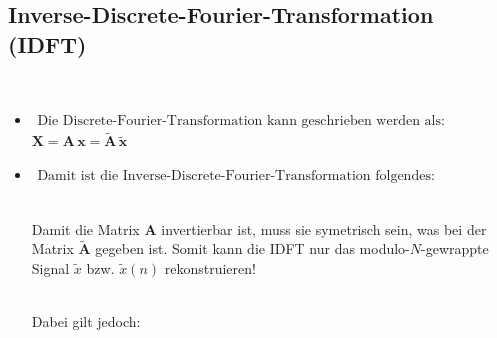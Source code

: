 	\subsection{Inverse-Discrete-Fourier-Transformation (IDFT)}
		$ $\\[-1.2cm]
		\begin{minipage}{0.6\textwidth}
		\begin{itemize}
			\item $\begin{array}{l}\!\!\!\text{Die Discrete-Fourier-Transformation kann geschrieben werden als:}\end{array}$\\
			$\bm{X} = \bm{A\,x} = \bm{\widetilde A\,\widetilde x}$\\[-0.3cm]
			\item $\begin{array}{l}\!\!\!\text{Damit ist die Inverse-Discrete-Fourier-Transformation folgendes:}\end{array}$\\[0.2cm]
			\\[0.3cm]
			\begin{danger}
			Damit die Matrix $\bm{A}$ invertierbar ist, muss sie symetrisch sein, was bei der Matrix $\widetilde{\bm{A}}$ gegeben ist. Somit kann die IDFT nur das modulo-$N$-gewrappte Signal $\widetilde{x}$ bzw. $\widetilde{x}(n)$ rekonstruieren!
			\end{danger}\\[0.1cm]
			Dabei gilt jedoch:$\qquad$
		\end{itemize}
		\end{minipage}\begin{minipage}{0.05\textwidth} $ $\end{minipage}

